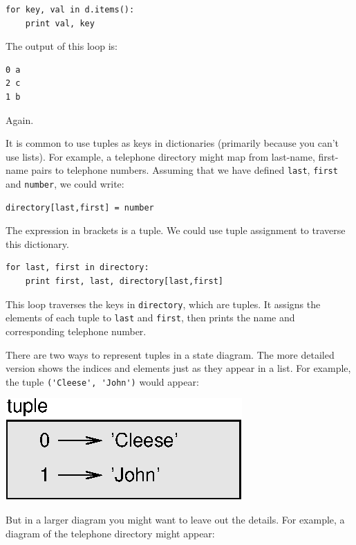 \documentclass[10pt]{book}
\begin{document}
\beforeverb
\begin{verbatim}
for key, val in d.items():
    print val, key
\end{verbatim}
\afterverb
%
The output of this loop is:

\beforeverb
\begin{verbatim}
0 a
2 c
1 b
\end{verbatim}
\afterverb
%
Again.


It is common to use tuples as keys in dictionaries (primarily because
you can't use lists).  For example, a telephone directory might map
from last-name, first-name pairs to telephone numbers.  Assuming
that we have defined {\tt last}, {\tt first} and {\tt number}, we
could write:

\beforeverb
\begin{verbatim}
directory[last,first] = number
\end{verbatim}
\afterverb
%
The expression in brackets is a tuple.  We could use tuple
assignment to traverse this dictionary.


\beforeverb
\begin{verbatim}
for last, first in directory:
    print first, last, directory[last,first]
\end{verbatim}
\afterverb
%
This loop traverses the keys in {\tt directory}, which are tuples.  It
assigns the elements of each tuple to {\tt last} and {\tt first}, then
prints the name and corresponding telephone number.

There are two ways to represent tuples in a state diagram.  The more
detailed version shows the indices and elements just as they appear in
a list.  For example, the tuple \verb"('Cleese', 'John')" would appear:


\beforefig
\centerline{\includegraphics{figs/tuple1.eps}}
\afterfig

But in a larger diagram you might want to leave out the
details.  For example, a diagram of the telephone directory might
appear:
\end{document}
